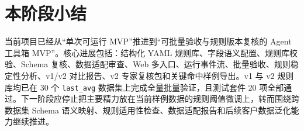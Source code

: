\documentclass[UTF8,a4paper,zihao=-4]{ctexart}
\begin{document}
\section{本阶段小结}

当前项目已经从“单次可运行 MVP”推进到“可批量验收与规则版本复核的 Agent 工具箱 MVP”。核心进展包括：结构化 YAML 规则库、字段语义配置、规则库校验、Schema 复核、数据适配审查、Web 多入口、运行事件流、批量验收、规则稳定性分析、v1/v2 对比报告、v2 专家复核包和关键命中样例导出。v1 与 v2 规则库均已在 30 个 \texttt{last\_avg} 数据集上完成全量批量验证，且测试套件 20 项全部通过。下一阶段应停止把主要精力放在当前样例数据的规则阈值微调上，转而围绕跨数据集 Schema 语义映射、规则适用性检查、数据适配报告和后续客户数据泛化能力继续推进。
\end{document}
